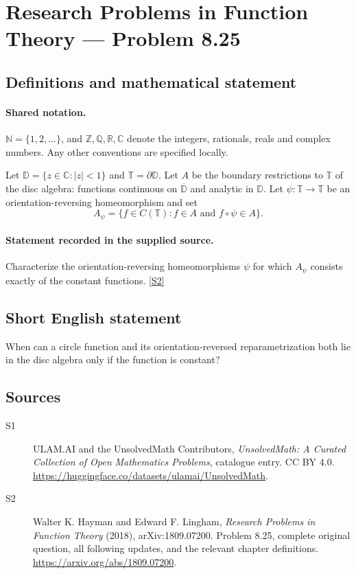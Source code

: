 \documentclass[11pt]{book}
\newcommand{\sref}[2]{\hyperlink{source:#1:#2}{[S#2]}}
\begin{document}
\section{Research Problems in Function Theory — Problem 8.25}\label{statement}

\subsection{Definitions and mathematical statement}

\paragraph{Shared notation.}$\mathbb N=\{1,2,\ldots\}$, and $\mathbb Z,\mathbb Q,\mathbb R,\mathbb C$ denote the integers, rationals, reals and complex numbers. Any other conventions are specified locally.


Let $\mathbb D=\{z\in\mathbb C:|z|<1\}$ and $\mathbb T=\partial\mathbb D$. Let $A$ be the boundary restrictions to $\mathbb T$ of the disc algebra: functions continuous on $\overline{\mathbb D}$ and analytic in $\mathbb D$. Let $\psi:\mathbb T\to\mathbb T$ be an orientation-reversing homeomorphism and set \[A_\psi=\{f\in C(\mathbb T):f\in A\text{ and }f\circ\psi\in A\}.\]
\paragraph{Statement recorded in the supplied source.}
Characterize the orientation-reversing homeomorphisms $\psi$ for which $A_\psi$ consists exactly of the constant functions. \sref{statement}{2}
\subsection{Short English statement}
When can a circle function and its orientation-reversed reparametrization both lie in the disc algebra only if the function is constant?
\subsection{Sources}
\begin{description}
\item[\hypertarget{source:statement:1}{S1}] ULAM.AI and the UnsolvedMath Contributors, \emph{UnsolvedMath: A Curated Collection of Open Mathematics Problems}, catalogue entry. CC BY 4.0. \url{https://huggingface.co/datasets/ulamai/UnsolvedMath}.
\item[\hypertarget{source:statement:2}{S2}] Walter K. Hayman and Edward F. Lingham, \emph{Research Problems in Function Theory} (2018), arXiv:1809.07200. Problem 8.25, complete original question, all following updates, and the relevant chapter definitions. \url{https://arxiv.org/abs/1809.07200}.
\end{description}
\label{end:statement}
\end{document}
